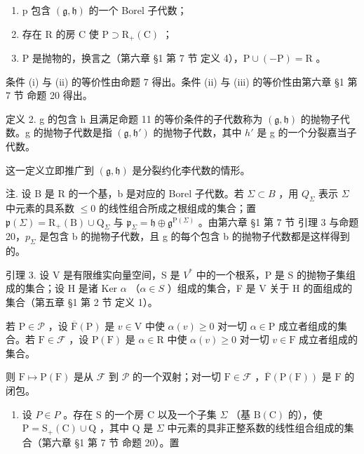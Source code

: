 \begin{enumerate}
\def\labelenumi{(\roman{enumi})}
\item
  p 包含 \((\mathfrak{g}, \mathfrak{h})\) 的一个 Borel 子代数；
\item
  存在 R 的房 C 使 \(\mathrm{P} \supset \mathrm{R}_{+}(\mathrm{C})\) ；
\item
  P 是抛物的，换言之（第六章 §1 第 7 节 定义 4），\(\mathrm{P} \cup (-\mathrm{P}) = \mathrm{R}\) 。
\end{enumerate}

条件 (i) 与 (ii) 的等价性由命题 7 得出。条件 (ii) 与 (iii) 的等价性由第六章 §1 第 7 节 命题 20 得出。

定义 2. g 的包含 h 且满足命题 11 的等价条件的子代数称为 \((\mathfrak{g}, \mathfrak{h})\) 的抛物子代数。g 的抛物子代数是指 \((\mathfrak{g}, \mathfrak{h}')\) 的抛物子代数，其中 \(h'\) 是 g 的一个分裂嘉当子代数。

这一定义立即推广到 \((\mathfrak{g}, \mathfrak{h})\) 是分裂约化李代数的情形。

注. 设 B 是 R 的一个基，b 是对应的 Borel 子代数。若 \(\Sigma \subset B\) ，用 \(Q_{\Sigma}\) 表示 \(\Sigma\) 中元素的具系数 \(\leq 0\) 的线性组合所成之根组成的集合；置 \(\mathfrak{p}(\Sigma) = \mathrm{R}_{+}(\mathrm{B}) \cup \mathrm{Q}_{\Sigma}\) 与 \(\mathfrak{p}_{\Sigma} = \mathfrak{h} \oplus \mathfrak{g}^{\mathrm{P}(\Sigma)}\) 。由第六章 §1 第 7 节 引理 3 与命题 20，\(p_{\Sigma}\) 是包含 b 的抛物子代数，且 g 的每个包含 b 的抛物子代数都是这样得到的。

引理 3. 设 V 是有限维实向量空间，S 是 \(V^{*}\) 中的一个根系，P 是 S 的抛物子集组成的集合；设 H 是诸 Ker \(\alpha\) （\(\alpha \in S\) ）组成的集合，F 是 V 关于 H 的面组成的集合（第五章 §1 第 2 节 定义 1）。

若 \(\mathrm{P} \in \mathcal{P}\) ，设 \(\overline{\mathrm{F}}(\mathrm{P})\) 是 \(v \in \mathrm{V}\) 中使 \(\alpha(v) \geq 0\) 对一切 \(\alpha \in \mathrm{P}\) 成立者组成的集合。若 \(\mathrm{F} \in \mathcal{F}\) ，设 \(\mathrm{P}(\mathrm{F})\) 是 \(\alpha \in \mathrm{R}\) 中使 \(\alpha(v) \geq 0\) 对一切 \(v \in \mathrm{F}\) 成立者组成的集合。

则 \(\mathrm{F} \mapsto \mathrm{P}(\mathrm{F})\) 是从 \(\mathcal{F}\) 到 \(\mathcal{P}\) 的一个双射；对一切 \(\mathrm{F} \in \mathcal{F}\) ，\(\overline{\mathrm{F}}(\mathrm{P}(\mathrm{F}))\) 是 \(\mathrm{F}\) 的闭包。

\begin{enumerate}
\def\labelenumi{\alph{enumi})}
\tightlist
\item
  设 \(P \in P\) 。存在 S 的一个房 C 以及一个子集 \(\Sigma\) （基 \(\mathrm{B}(\mathrm{C})\) 的），使 \(\mathrm{P} = \mathrm{S}_{+}(\mathrm{C}) \cup \mathrm{Q}\) ，其中 Q 是 \(\Sigma\) 中元素的具非正整系数的线性组合组成的集合（第六章 §1 第 7 节 命题 20）。置
\end{enumerate}

